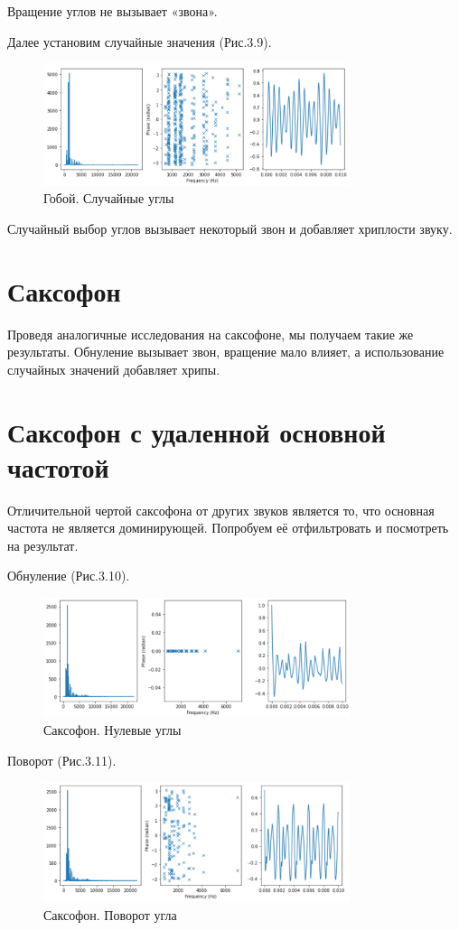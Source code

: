 \documentclass[a4paper,12pt]{report}
\begin{document}
    Вращение углов не вызывает «звона».
    
    Далее установим случайные значения (Рис.3.9).
\begin{figure}[H]
        \centering
        \includegraphics[width=0.8\textwidth]{fig3-9.PNG}
        \caption{Гобой. Случайные углы}
        \label{fig:fig3-9}
\end{figure}
    
    Случайный выбор углов вызывает некоторый звон и добавляет хриплости звуку. 
\section{Саксофон}  
    Проведя аналогичные исследования на саксофоне, мы получаем такие же результаты. Обнуление вызывает звон, вращение мало влияет, а использование случайных значений добавляет хрипы.
    
\section{Саксофон с удаленной основной частотой}
    Отличительной чертой саксофона от других звуков является то, что основная частота не является доминирующей. Попробуем её отфильтровать и посмотреть на результат.
    
    Обнуление (Рис.3.10).
\begin{figure}[H]
        \centering
        \includegraphics[width=0.8\textwidth]{fig3-10.PNG}
        \caption{Саксофон. Нулевые углы}
        \label{fig:fig3-10}
\end{figure}

    Поворот (Рис.3.11).
\begin{figure}[H]
        \centering
        \includegraphics[width=0.8\textwidth]{fig3-11.PNG}
        \caption{Саксофон. Поворот угла}
        \label{fig:fig3-11}
\end{figure}
\end{document}
